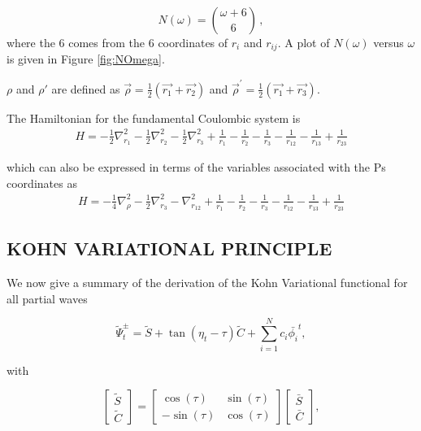 \documentclass[preprint,showpacs,preprintnumbers,amsmath,amssymb]{revtex4}
\newcommand{\beq}{\begin{equation}}
\newcommand{\eeq}{\end{equation}}
\begin{document}
\beq
\label{eq:NumberTermsOmega}
N(\omega) = \binom{\omega+6}{6} \, ,
\eeq
\noindent where the 6 comes from the 6 coordinates of $r_i$ and $r_{ij}$.  A plot of $N(\omega)$ versus $\omega$ is given in Figure \ref{fig:NOmega}.

$\rho$ and $\rho'$ are defined as $\vec{\rho} = \frac{1}{2}\left(\vec{r_1} + \vec{r_2}\right)$ and $\vec{\rho}^\prime = \frac{1}{2}\left(\vec{r_1} + \vec{r_3}\right)$.



The Hamiltonian for the fundamental Coulombic system is
\begin{align}
H = -\frac{1}{2} \nabla_{r_1}^2 - \frac{1}{2} \nabla_{r_2}^2 - \frac{1}{2} \nabla_{r_3}^2 + \frac {1}{r_1}-\frac {1}{r_2}-\frac {1}{r_3}-\frac {1}{r_{12}}-\frac {1}{r_{13}}+\frac {1}{r_{23}}	\label{Hamiltonian1}
\end{align}

\noindent which  can also be expressed in terms of the  variables associated with the Ps coordinates as
\begin{align}
H = -\frac{1}{4} \nabla_{\rho}^2 - \frac{1}{2} \nabla_{r_3}^2 - \nabla_{r_{12}}^2 + \frac {1}{r_1}-\frac {1}{r_2}-\frac {1}{r_3}-\frac {1}{r_{12}}-\frac {1}{r_{13}}+\frac {1}{r_{23}}
	\label{Hamiltonian2}
\end{align}
\subsection{ KOHN VARIATIONAL PRINCIPLE}

We now give a summary of the  derivation of  the  Kohn Variational functional for all partial waves 



\begin{equation}
\tilde{\Psi}_t^\pm = \tilde{S} + {\tan(\eta_t-\tau)}  \tilde{C} + \sum_{i=1}^N c_i \bar{\phi_i}^t ,
\label{eq:TrialSimpleGeneral}
\end{equation}

\noindent with

\begin{equation}
\begin{bmatrix}
\tilde{S} \\
\tilde{C}
\end{bmatrix}
=
\begin{bmatrix}
\cos(\tau) & \sin(\tau) \\
-\sin(\tau) & \cos(\tau)
\end{bmatrix}
\begin{bmatrix}
\bar{S} \\
\bar{C}
\end{bmatrix},
\end{equation}
\end{document}
